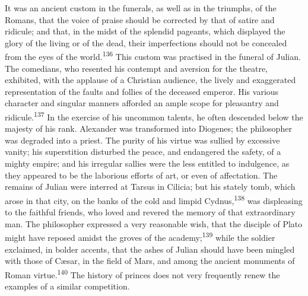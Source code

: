 It was an ancient custom in the funerals, as well as in the
triumphs, of the Romans, that the voice of praise should be
corrected by that of satire and ridicule; and that, in the midst
of the splendid pageants, which displayed the glory of the living
or of the dead, their imperfections should not be concealed from
the eyes of the world.\textsuperscript{136} This custom was practised in the
funeral of Julian. The comedians, who resented his contempt and
aversion for the theatre, exhibited, with the applause of a
Christian audience, the lively and exaggerated representation of
the faults and follies of the deceased emperor. His various
character and singular manners afforded an ample scope for
pleasantry and ridicule.\textsuperscript{137} In the exercise of his uncommon
talents, he often descended below the majesty of his rank.
Alexander was transformed into Diogenes; the philosopher was
degraded into a priest. The purity of his virtue was sullied by
excessive vanity; his superstition disturbed the peace, and
endangered the safety, of a mighty empire; and his irregular
sallies were the less entitled to indulgence, as they appeared to
be the laborious efforts of art, or even of affectation. The
remains of Julian were interred at Tarsus in Cilicia; but his
stately tomb, which arose in that city, on the banks of the cold
and limpid Cydnus,\textsuperscript{138} was displeasing to the faithful friends,
who loved and revered the memory of that extraordinary man. The
philosopher expressed a very reasonable wish, that the disciple
of Plato might have reposed amidst the groves of the academy;\textsuperscript{139}
while the soldier exclaimed, in bolder accents, that the ashes of
Julian should have been mingled with those of Cæsar, in the field
of Mars, and among the ancient monuments of Roman virtue.\textsuperscript{140} The
history of princes does not very frequently renew the examples of
a similar competition.






